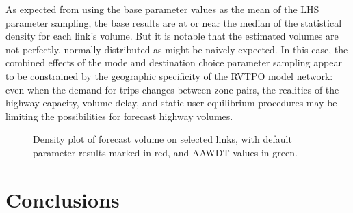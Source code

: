 \documentclass[
  futuretransp,
  submit,
  moreauthors,
]{Definitions/mdpi}
\begin{document}
As expected from using the base parameter values as the mean of the LHS
parameter sampling, the base results are at or near the median of the
statistical density for each link's volume. But it is notable that the
estimated volumes are not perfectly, normally distributed as might be
naively expected. In this case, the combined effects of the mode and
destination choice parameter sampling appear to be constrained by the
geographic specificity of the RVTPO model network: even when the demand
for trips changes between zone pairs, the realities of the highway
capacity, volume-delay, and static user equilibrium procedures may be
limiting the possibilities for forecast highway volumes.

\begin{figure}


\caption{\label{fig-densityplots}Density plot of forecast volume on
selected links, with default parameter results marked in red, and AAWDT
values in green.}

\end{figure}%


\section{Conclusions}\label{sec-conclusions}
\end{document}
